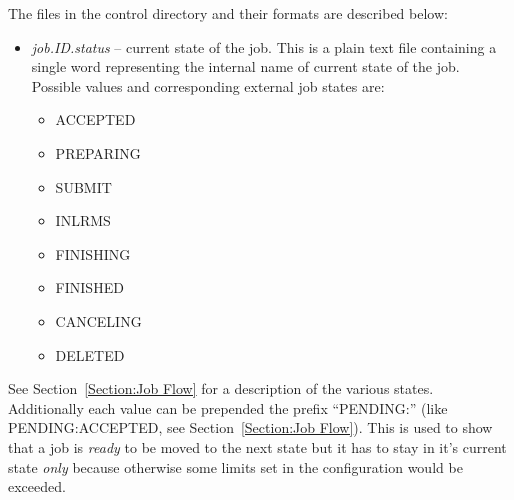 \documentclass{article}                            %
\begin{document}
The files in the control directory and their formats are described
below:

\begin{itemize}
\item \textit{job.ID.status} -- current state of the job. This is a plain
text file containing a single word representing the internal name
of current state of the job. Possible values and corresponding external
job states are:

\begin{itemize}
\item ACCEPTED
\item PREPARING
\item SUBMIT
\item INLRMS
\item FINISHING
\item FINISHED
\item CANCELING
\item DELETED
\end{itemize}
\end{itemize}

See Section~\ref{Section:Job Flow} for a description of the various
states. Additionally each value can be prepended the prefix {}``PENDING:''
(like PENDING:ACCEPTED, see Section~\ref{Section:Job Flow}). This
is used to show that a job is \emph{ready} to be moved to the next
state but it has to stay in it's current state \emph{only} because
otherwise some limits set in the configuration would be exceeded.
\end{document}
